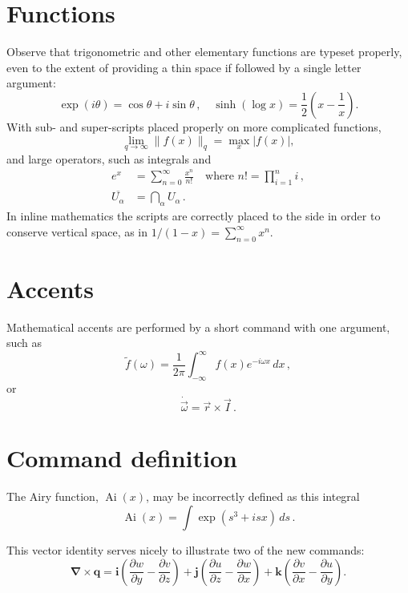 \documentclass[20pt,a4paper]{extarticle}
\begin{document}
\section{Functions}

Observe that trigonometric and other elementary functions are typeset 
properly, even to the extent of providing a thin space if followed by 
a single letter argument:
\[
	\exp(i\theta)=\cos\theta +i\sin\theta\,,\quad
	\sinh(\log x)=\frac{1}{2}\left( x-\frac{1}{x} \right).
\]
With sub- and super-scripts placed properly on more complicated 
functions,
\[
	\lim_{q\to\infty}\|f(x)\|_q 
	=\max_{x}|f(x)|,
\]
and large operators, such as integrals and
\begin{align*}
	e^x & =  \sum_{n=0}^\infty \frac{x^n}{n!}
	\quad\text{where }n!=\prod_{i=1}^n i\,,  \\
	\overline{U_\alpha} & =  \bigcap_\alpha U_\alpha\,.
\end{align*}
In inline mathematics the scripts are correctly placed to the side in 
order to conserve vertical space, as in
\(
	1/(1-x)=\sum_{n=0}^\infty x^n.
\)






\section{Accents}

Mathematical accents are performed by a short command with one 
argument, such as
\[
	\tilde f(\omega)=\frac{1}{2\pi}
	\int_{-\infty}^\infty f(x)e^{-i\omega x}\,dx\,,
\]
or
\[
	\dot{\vec \omega}=\vec r\times\vec I\,.
\]





\section{Command definition}

\newcommand{\Ai}{\operatorname{Ai}} 
The Airy function, $\Ai(x)$, may be incorrectly defined as this 
integral
\[
	\Ai(x)=\int\exp(s^3+isx)\,ds\,.
\]

\newcommand{\D}[2]{\frac{\partial #2}{\partial #1}}
\newcommand{\DD}[2]{\frac{\partial^2 #2}{\partial #1^2}}
\renewcommand{\vec}[1]{\boldsymbol{#1}}

This vector identity serves nicely to illustrate two of the new 
commands:
\[
	\vec\nabla\times\vec q
	=\vec i\left(\D yw-\D zv\right)
	+\vec j\left(\D zu-\D xw\right)
	+\vec k\left(\D xv-\D yu\right).
\]
\end{document}
